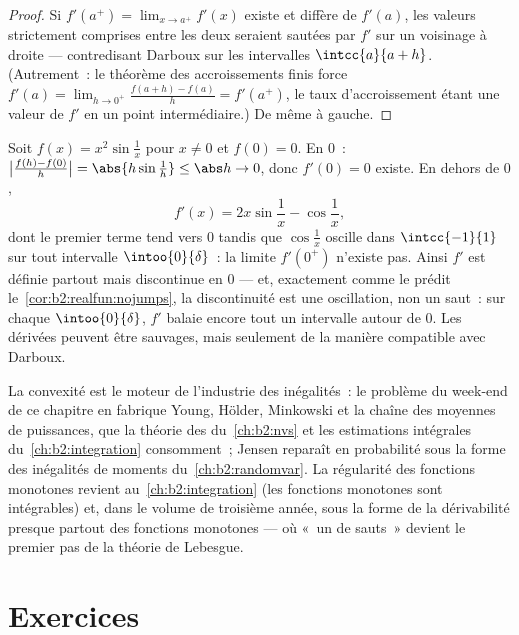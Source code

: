\begin{proof}
Si $f'(a^+) = \lim_{x\to a^+} f'(x)$ existe et diffère de $f'(a)$,
les valeurs strictement comprises entre les deux seraient sautées par
$f'$ sur un voisinage à droite --- contredisant Darboux sur les
intervalles $\intcc{a}{a + h}$. (Autrement~: le théorème des
accroissements finis force $f'(a) = \lim_{h\to0^+}
\frac{f(a+h)-f(a)}{h} = f'(a^+)$, le taux d'accroissement étant une
valeur de $f'$ en un point intermédiaire.) De même à gauche.
\end{proof}

\begin{example}\label{ex:b2:realfun:oscillation}
Soit $f(x) = x^2\sin\frac1x$ pour $x \neq 0$ et $f(0) = 0$. En
$0$~: $\bigl|\frac{f(h) - f(0)}{h}\bigr| = \abs{h\sin\frac1h}
\leq \abs h \to 0$, donc $f'(0) = 0$ existe. En dehors de $0$,
\[
f'(x) = 2x\sin\frac1x - \cos\frac1x ,
\]
dont le premier terme tend vers $0$ tandis que $\cos\frac1x$ oscille
dans $\intcc{-1}{1}$ sur tout intervalle $\intoo{0}{\delta}$~: la
limite $f'(0^+)$ n'existe pas. Ainsi $f'$ est définie partout mais
discontinue en $0$ --- et, exactement comme le prédit
le~\cref{cor:b2:realfun:nojumps}, la discontinuité est une
oscillation, non un saut~: sur chaque $\intoo{0}{\delta}$, $f'$
balaie encore tout un intervalle autour de $0$. Les dérivées peuvent
être sauvages, mais seulement de la manière compatible avec Darboux.
\end{example}

\begin{remark}
La convexité est le moteur de l'industrie des inégalités~: le
problème du week-end de ce chapitre en fabrique Young, Hölder,
Minkowski et la chaîne des moyennes de puissances, que la théorie des
 du~\cref{ch:b2:nvs} et les estimations intégrales
du~\cref{ch:b2:integration} consomment~; Jensen reparaît en
probabilité sous la forme des inégalités de moments
du~\cref{ch:b2:randomvar}. La régularité des fonctions monotones
revient au~\cref{ch:b2:integration} (les fonctions monotones sont
intégrables) et, dans le volume de troisième année, sous la forme de
la dérivabilité presque partout des fonctions monotones --- où «~un
 de sauts~» devient le premier pas de la théorie
de Lebesgue.
\end{remark}

\section{Exercices}

